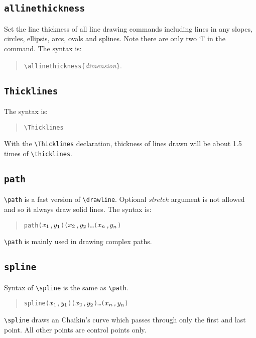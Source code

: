 \subsection{\tt \BS allinethickness}
Set the line thickness of all line drawing commands including
lines in any slopes, circles, ellipsis, arcs, ovals and splines.
Note there are only two `l' in the command. The syntax is:
\begin{quote}
\verb|\allinethickness{|{\em dimension}\verb|}|.
\end{quote}


\subsection{\tt \BS Thicklines}
The syntax is:
\begin{quote}
\verb|\Thicklines|
\end{quote}
With the \verb|\Thicklines| declaration, thickness of lines drawn
will be about 1.5 times of \verb|\thicklines|.


\subsection{\tt \BS path}
\verb|\path| is a fast version of \verb|\drawline|. Optional {\em
stretch\/} argument is not allowed and so it always draw solid
lines. The syntax is:
\begin{quote}
\begin{alltt}
\BS{}path(\(x\sb{1}\),\(y\sb{1}\))(\(x\sb{2}\),\(y\sb{2}\))\ldots(\(x\sb{n}\),\(y\sb{n}\))
\end{alltt}
\end{quote}
\verb|\path| is mainly used in drawing complex paths.


\subsection{\tt \BS spline}
Syntax of \verb|\spline| is the same as \verb|\path|.
\begin{quote}
\begin{alltt}
\BS{}spline(\(x\sb{1}\),\(y\sb{1}\))(\(x\sb{2}\),\(y\sb{2}\))\ldots(\(x\sb{n}\),\(y\sb{n}\))
\end{alltt}
\end{quote}
\verb|\spline| draws an Chaikin's curve which passes through only
the first and last point. All other points are control points
only.


